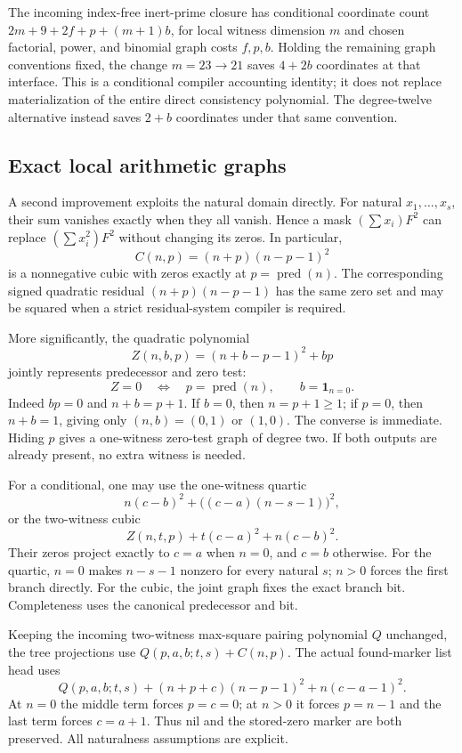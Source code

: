 The incoming index-free inert-prime closure has conditional coordinate
count $2m+9+2f+p+(m+1)b$, for local witness dimension $m$ and chosen
factorial, power, and binomial graph costs $f,p,b$.  Holding the remaining
graph conventions fixed, the change $m=23\longrightarrow21$ saves
$4+2b$ coordinates at that interface.  This is a conditional compiler
accounting identity; it does not replace materialization of the entire
direct consistency polynomial.  The degree-twelve alternative instead
saves $2+b$ coordinates under that same convention.

\subsection{Exact local arithmetic graphs}

A second improvement exploits the natural domain directly.  For natural
$x_1,\ldots,x_s$, their sum vanishes exactly when they all vanish.
Hence a mask $(\sum x_i)F^2$ can replace $(\sum x_i^2)F^2$ without
changing its zeros.  In particular,
\[
 C(n,p)=(n+p)(n-p-1)^2
\]
is a nonnegative cubic with zeros exactly at $p=\operatorname{pred}(n)$.
The corresponding signed quadratic residual $(n+p)(n-p-1)$ has the same
zero set and may be squared when a strict residual-system compiler is
required.

More significantly, the quadratic polynomial
\[
 Z(n,b,p)=(n+b-p-1)^2+bp
\]
jointly represents predecessor and zero test:
\[
 Z=0\quad\Longleftrightarrow\quad
 p=\operatorname{pred}(n),\qquad b=\mathbf1_{n=0}.
\]
Indeed $bp=0$ and $n+b=p+1$.  If $b=0$, then $n=p+1\geq1$; if
$p=0$, then $n+b=1$, giving only $(n,b)=(0,1)$ or $(1,0)$.
The converse is immediate.  Hiding $p$ gives a one-witness zero-test
graph of degree two.  If both outputs are already present, no extra
witness is needed.

For a conditional, one may use the one-witness quartic
\[
 n(c-b)^2+\bigl((c-a)(n-s-1)\bigr)^2,
\]
or the two-witness cubic
\[
 Z(n,t,p)+t(c-a)^2+n(c-b)^2.
\]
Their zeros project exactly to $c=a$ when $n=0$, and $c=b$ otherwise.
For the quartic, $n=0$ makes $n-s-1$ nonzero for every natural $s$;
$n>0$ forces the first branch directly.  For the cubic, the joint graph
fixes the exact branch bit.  Completeness uses the canonical predecessor
and bit.

Keeping the incoming two-witness max-square pairing polynomial $Q$
unchanged, the tree projections use $Q(p,a,b;t,s)+C(n,p)$.  The actual
found-marker list head uses
\[
 Q(p,a,b;t,s)+(n+p+c)(n-p-1)^2+n(c-a-1)^2.
\]
At $n=0$ the middle term forces $p=c=0$; at $n>0$ it forces $p=n-1$
and the last term forces $c=a+1$.  Thus nil and the stored-zero marker
are both preserved.  All naturalness assumptions are explicit.

